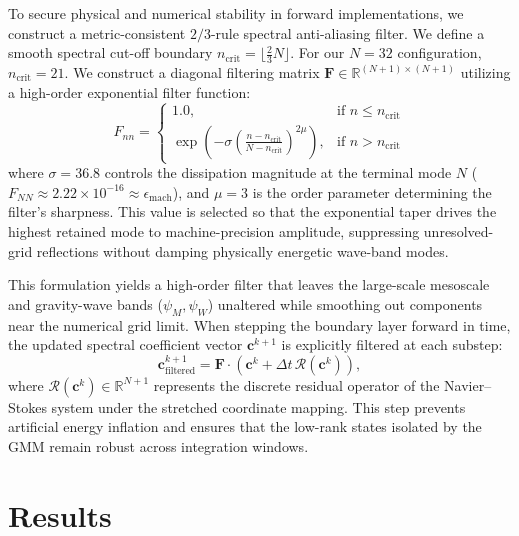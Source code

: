 \documentclass[11pt,a4paper]{article}
\begin{document}
To secure physical and numerical stability in forward implementations, we construct a metric-consistent $2/3$-rule spectral anti-aliasing filter. We define a smooth spectral cut-off boundary $n_{\mathrm{crit}} = \lfloor \frac{2}{3} N \rfloor$. For our $N=32$ configuration, $n_{\mathrm{crit}} = 21$. We construct a diagonal filtering matrix $\mathbf{F} \in \mathbb{R}^{(N+1) \times (N+1)}$ utilizing a high-order exponential filter function:
\begin{equation}
F_{nn} = \begin{cases}
1.0, & \text{if } n \le n_{\mathrm{crit}} \\
\exp\left( -\sigma \left( \frac{n - n_{\mathrm{crit}}}{N - n_{\mathrm{crit}}} \right)^{\! 2\mu} \right), & \text{if } n > n_{\mathrm{crit}}
\end{cases}
\label{eq:exponential_filter}
\end{equation}
where $\sigma = 36.8$ controls the dissipation magnitude at the terminal mode $N$ ($F_{NN} \approx 2.22 \times 10^{-16} \approx \epsilon_{\mathrm{mach}}$), and $\mu = 3$ is the order parameter determining the filter's sharpness. This value is selected so that the exponential taper drives the highest retained mode to machine-precision amplitude, suppressing unresolved-grid reflections without damping physically energetic wave-band modes.

This formulation yields a high-order filter that leaves the large-scale mesoscale and gravity-wave bands ($\psi_M, \psi_W$) unaltered while smoothing out components near the numerical grid limit. When stepping the boundary layer forward in time, the updated spectral coefficient vector $\mathbf{c}^{k+1}$ is explicitly filtered at each substep:
\begin{equation}
\mathbf{c}^{k+1}_{\mathrm{filtered}} = \mathbf{F} \cdot \left( \mathbf{c}^k + \Delta t \, \mathbf{\mathcal{R}}(\mathbf{c}^k) \right),
\label{eq:filtered_time_step}
\end{equation}
where $\mathbf{\mathcal{R}}(\mathbf{c}^k) \in \mathbb{R}^{N+1}$ represents the discrete residual operator of the Navier--Stokes system under the stretched coordinate mapping. This step prevents artificial energy inflation and ensures that the low-rank states isolated by the GMM remain robust across integration windows.

 \section{Results}
\label{sec:results}
\end{document}
